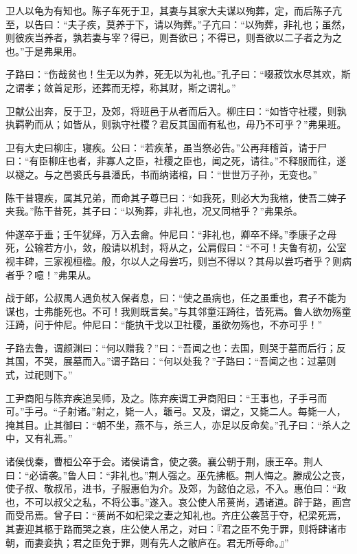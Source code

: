 \documentclass[]{article}
\begin{document}
卫人以龟为有知也。陈子车死于卫，其妻与其家大夫谋以殉葬，定，而后陈子亢至，以告曰：``夫子疾，莫养于下，请以殉葬。''子亢曰：``以殉葬，非礼也；虽然，则彼疾当养者，孰若妻与宰？得已，则吾欲已；不得已，则吾欲以二子者之为之也。''于是弗果用。

子路曰：``伤哉贫也！生无以为养，死无以为礼也。''孔子曰：``啜菽饮水尽其欢，斯之谓孝；敛首足形，还葬而无椁，称其财，斯之谓礼。''

卫献公出奔，反于卫，及郊，将班邑于从者而后入。柳庄曰：``如皆守社稷，则孰执羁靮而从；如皆从，则孰守社稷？君反其国而有私也，毋乃不可乎？''弗果班。

卫有大史曰柳庄，寝疾。公曰：``若疾革，虽当祭必告。''公再拜稽首，请于尸曰：``有臣柳庄也者，非寡人之臣，社稷之臣也，闻之死，请往。''不释服而往，遂以襚之。与之邑裘氏与县潘氏，书而纳诸棺，曰：``世世万子孙，无变也。''

陈干昔寝疾，属其兄弟，而命其子尊已曰：``如我死，则必大为我棺，使吾二婢子夹我。''陈干昔死，其子曰：``以殉葬，非礼也，况又同棺乎？''弗果杀。

仲遂卒于垂；壬午犹绎，万入去龠。仲尼曰：``非礼也，卿卒不绎。''季康子之母死，公输若方小，敛，般请以机封，将从之，公肩假曰：``不可！夫鲁有初，公室视丰碑，三家视桓楹。般，尔以人之母尝巧，则岂不得以？其母以尝巧者乎？则病者乎？噫！''弗果从。

战于郎，公叔禺人遇负杖入保者息，曰：``使之虽病也，任之虽重也，君子不能为谋也，士弗能死也。不可！我则既言矣。''与其邻童汪踦往，皆死焉。鲁人欲勿殇童汪踦，问于仲尼。仲尼曰：``能执干戈以卫社稷，虽欲勿殇也，不亦可乎！''

子路去鲁，谓颜渊曰：``何以赠我？''曰：``吾闻之也：去国，则哭于墓而后行；反其国，不哭，展墓而入。''谓子路曰：``何以处我？''子路曰：``吾闻之也：过墓则式，过祀则下。''

工尹商阳与陈弃疾追吴师，及之。陈弃疾谓工尹商阳曰：``王事也，子手弓而可。''手弓。``子射诸。''射之，毙一人，韔弓。又及，谓之，又毙二人。每毙一人，掩其目。止其御曰：``朝不坐，燕不与，杀三人，亦足以反命矣。''孔子曰：``杀人之中，又有礼焉。''

诸侯伐秦，曹桓公卒于会。诸侯请含，使之袭。襄公朝于荆，康王卒。荆人曰：``必请袭。''鲁人曰：``非礼也。''荆人强之。巫先拂柩。荆人悔之。滕成公之丧，使子叔、敬叔吊，进书，子服惠伯为介。及郊，为懿伯之忌，不入。惠伯曰：``政也，不可以叔父之私，不将公事。''遂入。哀公使人吊蒉尚，遇诸道。辟于路，画宫而受吊焉。曾子曰：``蒉尚不如杞梁之妻之知礼也。齐庄公袭莒于夺，杞梁死焉，其妻迎其柩于路而哭之哀，庄公使人吊之，对曰：『君之臣不免于罪，则将肆诸市朝，而妻妾执；君之臣免于罪，则有先人之敝庐在。君无所辱命。』''
\end{document}
